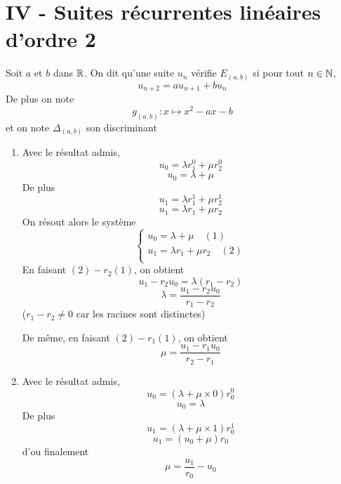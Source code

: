 \section*{IV - Suites récurrentes linéaires d'ordre 2}
Soit $a$ et $b$ dans $\mathbb{R}$. On dit qu'une suite $u_n$ vérifie $E_{(a,b)}$ si pour tout $n\in \mathbb{N}$, 
$$u_{n+2} = au_{n+1} + bu_n$$
De plus on note 
$$g_{(a,b)} : x\mapsto x^2-ax-b$$ et on note $\Delta_{(a,b)}$ son discriminant
\begin{enumerate}
\item Avec le résultat admis, 
$$u_0 = \lambda r_1^0 + \mu r_2^0$$
$$\boxed{u_0 = \lambda + \mu}$$
De plus 
$$u_1 = \lambda r_1^1 + \mu r_2^1$$
$$\boxed{u_1 = \lambda r_1 + \mu r_2}$$
On résout alors le système 
$$\left\lbrace\begin{array}{l}
u_0 = \lambda + \mu \quad(1)\\
u_1 = \lambda r_1 + \mu r_2 \quad(2)\\
\end{array}\right.$$
En faisant $(2) - r_2(1)$, on obtient 
$$u_1 - r_2u_0 = \lambda (r_1 - r_2)$$
$$\boxed{\lambda = \dfrac{u_1-r_2u_0}{r_1-r_2}}$$
($r_1-r_2 \neq 0$ car les racines sont distinctes)\newline

De même, en faisant $(2) - r_1 (1)$, on obtient 
$$\boxed{\mu = \dfrac{u_1-r_1u_0}{r_2-r_1}}$$
\item Avec le résultat admis, 
$$u_0 = (\lambda + \mu\times 0)r_0^0$$
$$\boxed{u_0 = \lambda}$$
De plus 
$$u_1 = (\lambda + \mu\times 1) r_0^1$$
$$u_1 = (u_0 + \mu)r_0$$
d'ou finalement
$$\boxed{\mu = \dfrac{u_1}{r_0} - u_0}$$
\end{enumerate}
